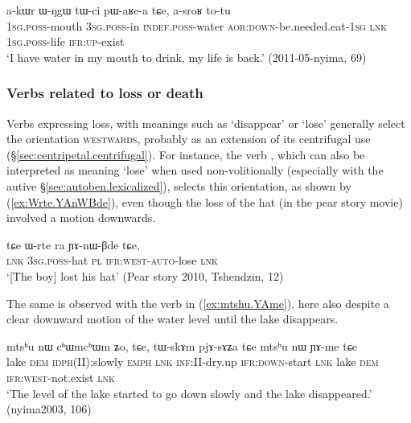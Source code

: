 \begin{exe}
\ex \label{ex:tWci.paRea}
\gll a-kɯr ɯ-ŋgɯ tɯ-ci pɯ-aʁe-a tɕe, a-sroʁ to-tu  \\
\textsc{1sg}.\textsc{poss}-mouth \textsc{3sg}.\textsc{poss}-in \textsc{indef}.\textsc{poss}-water \textsc{aor}:\textsc{down}-be.needed.eat-\textsc{1sg} \textsc{lnk} \textsc{1sg}.\textsc{poss}-life \textsc{ifr}:\textsc{up}-exist \\
\glt `I have water in my mouth to drink, my life is back.' (2011-05-nyima, 69)
\end{exe} 

\subsubsection{Verbs related to loss or death} \label{sec:preverb.loss}
Verbs expressing loss, with meanings such as `disappear' or `lose' generally select the orientation \textsc{westwards}, probably as an extension of its centrifugal use (§\ref{sec:centripetal.centrifugal}). For instance, the verb , which can also be interpreted as meaning `lose' when used non-volitionally (especially with the autive §\ref{sec:autoben.lexicalized}), selects this orientation, as shown by (\ref{ex:Wrte.YAnWBde}), even though the loss of the hat (in the pear story movie) involved a motion downwards.
 
\begin{exe}
\ex \label{ex:Wrte.YAnWBde}
\gll tɕe ɯ-rte ra ɲɤ-nɯ-βde tɕe, \\
\textsc{lnk} \textsc{3sg}.\textsc{poss}-hat \textsc{pl} \textsc{ifr}:\textsc{west}-\textsc{auto}-lose \textsc{lnk} \\
\glt  `[The boy] lost his hat' (Pear story 2010, Tshendzin,  12)
\end{exe} 

The same is observed with the verb  in (\ref{ex:mtshu.YAme}), here also despite a clear downward motion of the water level until the lake disappears.

\begin{exe}
\ex \label{ex:mtshu.YAme}
\gll mtsʰu nɯ cʰɯmcʰɯm ʑo, tɕe, tɯ-skɤm pjɤ-sɤʑa tɕe mtsʰu nɯ ɲɤ-me tɕe \\
lake \textsc{dem} \textsc{idph}(II):slowly \textsc{emph} \textsc{lnk} \textsc{inf}:II-dry.up \textsc{ifr}:\textsc{down}-start \textsc{lnk} lake \textsc{dem} \textsc{ifr}:\textsc{west}-not.exist \textsc{lnk} \\
\glt `The level of the lake started to go down slowly and the lake disappeared.' (nyima2003, 106)
\end{exe} 

